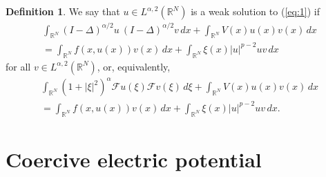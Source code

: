 \documentclass[11pt]{amsart}
\numberwithin{equation}{section}
\theoremstyle{remark}
\theoremstyle{definition}
\newtheorem{definition}[theorem]{Definition}
\begin{document}
\begin{definition}
	We say that $u \in L^{\alpha,2}(\mathbb{R}^N)$ is a weak solution to (\ref{eq:1}) if
	\begin{multline*}
		\int_{\mathbb{R}^N} (I-\Delta)^{\alpha /2} u \ (I-\Delta)^{\alpha/2} v \, dx + \int_{\mathbb{R}^N} V(x) u(x) v(x) \, dx \\
		= \int_{\mathbb{R}^N} f(x,u(x))v(x) \, dx  + \int_{\mathbb{R}^N} \xi(x) |u|^{p-2}uv \, dx
	\end{multline*}
	for all $v \in L^{\alpha,2}(\mathbb{R}^N)$, or, equivalently,
	\begin{multline*}
	\int_{\mathbb{R}^N} (1+|\xi|^2)^\alpha \mathcal{F}u(\xi) \mathcal{F}v(\xi) \, d\xi + \int_{\mathbb{R}^N} V(x) u(x) v(x) \, dx \\
	= \int_{\mathbb{R}^N} f(x,u(x))v(x) \, dx  + \int_{\mathbb{R}^N} \xi(x) |u|^{p-2}uv \, dx.
	\end{multline*}
\end{definition}

\section{Coercive electric potential}
\end{document}
